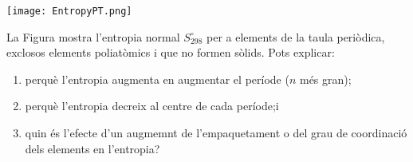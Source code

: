 
\begin{exr}{}
\begin{center}
\texttt{[image: EntropyPT.png]}
\end{center}

La Figura mostra l'entropia normal $S^{\circ}_{298}$ per a elements de la taula periòdica, exclosos elements poliatòmics i que no formen sòlids.\cite{thoms_periodic_1995} Pots explicar:
\begin{enumerate}
\item perquè l'entropia augmenta en augmentar el període ($n$ més gran);
\item perquè l'entropia decreix al centre de cada període;i
\item quin és l'efecte d'un augmemnt de l'empaquetament o del grau de coordinació dels elements en l'entropia?
\end{enumerate}
\end{exr}
